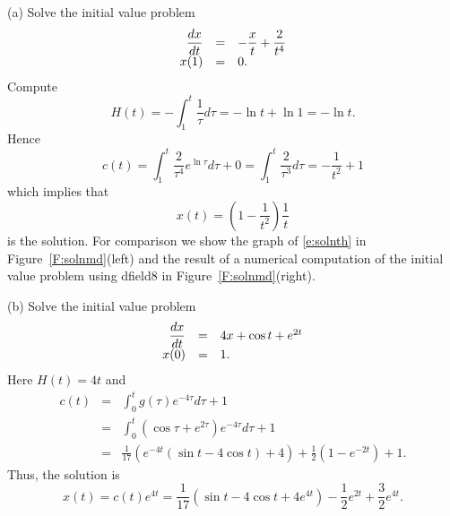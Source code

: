 \documentclass{ximera}
\begin{document}
(a)   Solve the initial value problem
\begin{equation} \label{e:solntheq}
\begin{array}{rcl}
\displaystyle \frac{dx}{dt} & = & -\displaystyle \frac{x}{t} + \frac{2}{t^4}\\
x(1) & = & 0.
\end{array}
\end{equation}
Compute
\[
H(t)= -\int_1^t\frac{1}{\tau}d\tau = -\ln t +\ln 1 = -\ln t.
\]
Hence 
\[
c(t)=\int_1^t \frac{2}{\tau^4}e^{\ln\tau}d\tau + 0
=\int_1^t \frac{2}{\tau^3} d\tau = -\frac{1}{t^2}+1
\]
which implies that 
\begin{equation}  \label{e:solnth}
x(t)=\left(1-\frac{1}{t^2}\right)\frac{1}{t}
\end{equation}
is the solution. For comparison we show the graph of \eqref{e:solnth} in 
Figure~\ref{F:solnmd}(left) and the result of a numerical computation of 
the initial value problem using {\sf dfield8} 
in Figure~\ref{F:solnmd}(right).

\begin{figure*}[htb]
           \centerline{%
           }
           \caption{(Left) Graph of solution~\protect\eqref{e:solnth} to equation 
	\protect\eqref{e:solntheq}. (Right) The time series for solution to 
	\protect\eqref{e:solntheq} with initial condition $x(1)=0$ using 
	{\sf dfield8}.}
           \label{F:solnmd}
\end{figure*}

\noindent (b) Solve the initial value problem
\[
\begin{array}{rcl}
\displaystyle \frac{dx}{dt} & = & 4x + \cos t + e^{2t} \\
x(0) & = & 1.
\end{array}
\]
Here $H(t)=4t$ and 
\begin{eqnarray*}
c(t) & = &  \int_0^t g(\tau)e^{-4\tau} d\tau +1\\
& = & \int_0^t \left(\cos\tau + e^{2\tau}\right)e^{-4\tau} d\tau
+1\\
& = & \frac{1}{17}\left( e^{-4t}(\sin t - 4\cos t)+4\right) +
\frac{1}{2}\left(1-e^{-2t}\right) + 1.
\end{eqnarray*}
Thus, the solution is
\[
x(t)=c(t) e^{4t} = \frac{1}{17}(\sin t - 4\cos t+4e^{4t}) -
\frac{1}{2}e^{2t} + \frac{3}{2}e^{4t}.
\]


\EXER

\TEXER 
\end{document}
